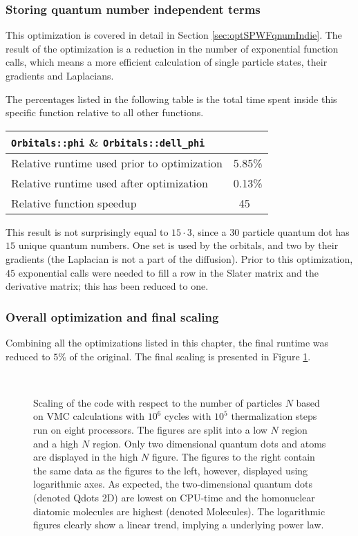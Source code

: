\subsubsection{Storing quantum number independent terms}

This optimization is covered in detail in Section \ref{sec:optSPWFqnumIndie}. The result of the optimization is a reduction in the number of exponential function calls, which means a more efficient calculation of single particle states, their gradients and Laplacians.

The percentages listed in the following table is the total time spent inside this specific function relative to all other functions. 

\begin{tabular}{ll}
 \verb+Orbitals::phi+ \& \verb+Orbitals::dell_phi+ & \\
 \hline\hline
 Relative runtime used prior to optimization & 5.85\% \\
 Relative runtime used after optimization    & 0.13\% \\
 \hline
 Relative function speedup                   & ~45
\end{tabular}

This result is not surprisingly equal to $15\cdot 3$, since a $30$ particle quantum dot has $15$ unique quantum numbers. One set is used by the orbitals, and two by their gradients (the Laplacian is not a part of the diffusion). Prior to this optimization, $45$ exponential calls were needed to fill a row in the Slater matrix and the derivative matrix; this has been reduced to one.

\subsubsection{Overall optimization and final scaling}

Combining all the optimizations listed in this chapter, the final runtime was reduced to $5\%$ of the original. The final scaling is presented in Figure \ref{fig:scaling}.

\begin{figure}[h]
 \begin{center}
   \\
  \caption{Scaling of the code with respect to the number of particles $N$ based on VMC calculations with $10^6$ cycles with $10^5$ thermalization steps run on eight processors. The figures are split into a low $N$ region and a high $N$ region. Only two dimensional quantum dots and atoms are displayed in the high $N$ figure. The figures to the right contain the same data as the figures to the left, however, displayed using logarithmic axes. As expected, the two-dimensional quantum dots (denoted Qdots 2D) are lowest on CPU-time and the homonuclear diatomic molecules are highest (denoted Molecules). The logarithmic figures clearly show a linear trend, implying a underlying power law.}
  \label{fig:scaling}
 \end{center}
\end{figure}

